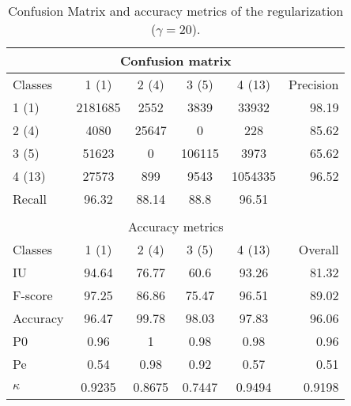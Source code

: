 \begin{table}[H]
\begin{center}
\footnotesize
\begin{tabular}{|l|c|c|c|c|r|}
\hline
\multicolumn{6}{|c|}{Confusion matrix} \\
\hline
 Classes & 1 (1) & 2 (4) & 3 (5) & 4 (13) & Precision \\
\hline
1 (1) & 2181685 & 2552 & 3839 & 33932 & 98.19 \\
\hline
2 (4) & 4080 & 25647 & 0 & 228 & 85.62 \\
\hline
3 (5) & 51623 & 0 & 106115 & 3973 & 65.62 \\
\hline
4 (13) & 27573 & 899 & 9543 & 1054335 & 96.52 \\
\hline
Recall & 96.32 & 88.14 & 88.8 & 96.51 &  \\
\hline
\multicolumn{6}{c}{ } \\
\hline
\multicolumn{6}{|c|}{Accuracy metrics} \\
\hline
 Classes & 1 (1) & 2 (4) & 3 (5) & 4 (13) & Overall \\
\hline
IU & 94.64 & 76.77 & 60.6 & 93.26 & 81.32 \\
\hline
F-score & 97.25 & 86.86 & 75.47 & 96.51 & 89.02 \\
\hline
Accuracy & 96.47 & 99.78 & 98.03 & 97.83 & 96.06 \\
\hline
P0 & 0.96 & 1 & 0.98 & 0.98 & 0.96 \\
\hline
Pe & 0.54 & 0.98 & 0.92 & 0.57 & 0.51 \\
\hline
$\kappa$ & 0.9235 & 0.8675 & 0.7447 & 0.9494 & 0.9198 \\
\hline
\end{tabular}
\caption{Confusion Matrix and accuracy metrics of the regularization ($\gamma=20$).}
\label{table:}
\end{center}
\end{table}
